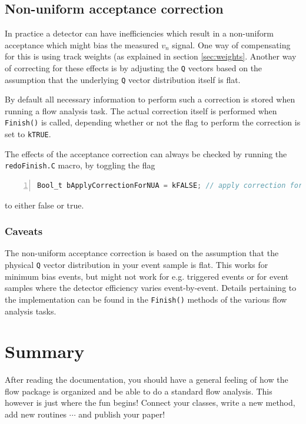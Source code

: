 \documentclass[a4paper]{book}
\numberwithin{equation}{subsection}
\begin{document}
\section{Non-uniform acceptance correction}  
In practice a detector can have inefficiencies which result in a non-uniform acceptance which might bias the measured $v_n$ signal. One way of compensating for this is using track weights (as explained in section \ref{sec:weights}. Another way of correcting for these effects is by adjusting the \texttt{Q} vectors based on the assumption that the underlying \texttt{Q} vector distribution itself is flat. 

By default all necessary information to perform such a correction is stored when running a flow analysis task. The actual correction itself is performed when 
\texttt{Finish()} is called, depending whether or not the flag to perform the correction is set to \texttt{kTRUE}.

The effects of the acceptance correction can always be checked by running the \texttt{redoFinish.C} macro, by toggling the flag
\begin{lstlisting}[language=C, numbers=left]
Bool_t bApplyCorrectionForNUA = kFALSE; // apply correction for non-uniform acceptance\end{lstlisting}
to either false or true.
\subsection{Caveats}
The non-uniform acceptance correction is based on the assumption that the physical \texttt{Q} vector distribution in your event sample is flat. This works for minimum bias events, but might not work for e.g. triggered events or for event samples where the detector efficiency varies event-by-event. Details pertaining to the implementation can be found in the \texttt{Finish()} methods of the various flow analysis tasks.

\chapter{Summary}
After reading the documentation, you should have a general feeling of how the flow package is organized and be able to do a standard flow analysis. This however is just where the fun begins! Connect your classes, write a new method, add new routines $\cdots$ and publish your paper!
\end{document}
